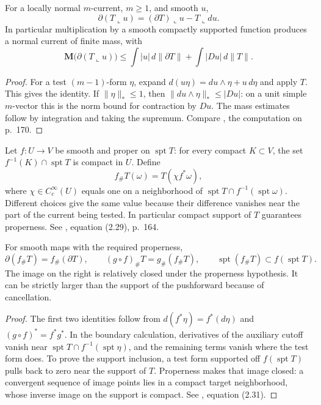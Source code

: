 \begin{proposition}\label{prop:current-cutoff-boundary}
For a locally normal $m$-current, $m\geq1$, and smooth $u$,
\[
 \partial(T\llcorner u)=(\partial T)\llcorner u-T\llcorner du.
\]
In particular multiplication by a smooth compactly supported function produces a normal current of finite mass, with
\[
 \mathbf M\bigl(\partial(T\llcorner u)\bigr)
 \leq\int|u|\,d\|\partial T\|+\int|Du|\,d\|T\|.
\]
\end{proposition}
\begin{proof}
For a test $(m-1)$-form $\eta$, expand $d(u\eta)=du\wedge\eta+u\,d\eta$ and apply $T$. This gives the identity. If $\|\eta\|_*\leq1$, then $\|du\wedge\eta\|_*\leq|Du|$: on a unit simple $m$-vector this is the norm bound for contraction by $Du$. The mass estimates follow by integration and taking the supremum. Compare \cite{Sim18}, the computation on p.~170.
\end{proof}

\begin{definition}\label{def:current-pushforward}
Let $f:U\to V$ be smooth and proper on $\operatorname{spt}T$: for every compact $K\subset V$, the set $f^{-1}(K)\cap\operatorname{spt}T$ is compact in $U$. Define
\[
 f_\#T(\omega)=T(\chi f^*\omega),
\]
where $\chi\in C_c^\infty(U)$ equals one on a neighborhood of $\operatorname{spt}T\cap f^{-1}(\operatorname{spt}\omega)$. Different choices give the same value because their difference vanishes near the part of the current being tested. In particular compact support of $T$ guarantees properness. See \cite{Sim18}, equation (2.29), p.~164.
\end{definition}

\begin{proposition}\label{prop:current-pushforward-identities}
For smooth maps with the required properness,
\[
 \partial(f_\#T)=f_\#(\partial T),\qquad
 (g\circ f)_\#T=g_\#(f_\#T),\qquad
 \operatorname{spt}(f_\#T)\subset f(\operatorname{spt}T).
\]
The image on the right is relatively closed under the properness hypothesis. It can be strictly larger than the support of the pushforward because of cancellation.
\end{proposition}
\begin{proof}
The first two identities follow from $d(f^*\eta)=f^*(d\eta)$ and $(g\circ f)^*=f^*g^*$. In the boundary calculation, derivatives of the auxiliary cutoff vanish near $\operatorname{spt}T\cap f^{-1}(\operatorname{spt}\eta)$, and the remaining terms vanish where the test form does. To prove the support inclusion, a test form supported off $f(\operatorname{spt}T)$ pulls back to zero near the support of $T$. Properness makes that image closed: a convergent sequence of image points lies in a compact target neighborhood, whose inverse image on the support is compact. See \cite{Sim18}, equation (2.31).
\end{proof}

